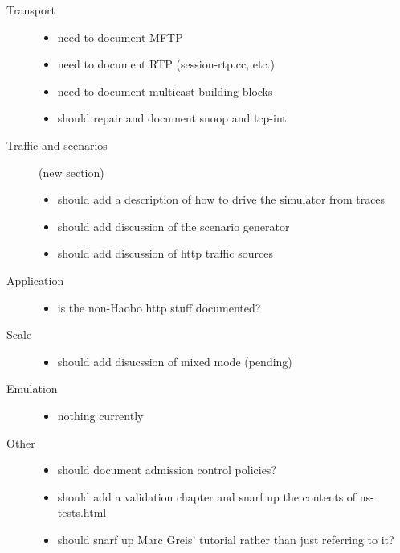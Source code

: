 \begin{description}
\item[Transport]

	\begin{itemize}
	\item need to document MFTP
	\item need to document RTP (session-rtp.cc, etc.)
	\item need to document multicast building blocks
	\item should repair and document snoop and tcp-int
	\end{itemize}

\item[Traffic and scenarios] (new section)

	\begin{itemize}
	\item should add a description of how to drive the simulator
		from traces
	\item should add discussion of the scenario generator
	\item should add discussion of http traffic sources
	\end{itemize}

\item[Application]

	\begin{itemize}
	\item is the non-Haobo http stuff documented?
	\end{itemize}

\item[Scale]

	\begin{itemize}
	\item should add disucssion of mixed mode (pending)
	\end{itemize}

\item[Emulation]

	\begin{itemize}
	\item nothing currently
	\end{itemize}

\item[Other]

	\begin{itemize}
	\item should document admission control policies?
	\item should add a validation chapter and snarf
		up the contents of ns-tests.html
	\item should snarf up Marc Greis' tutorial
		rather than just referring to it?
	\end{itemize}

\end{description}

